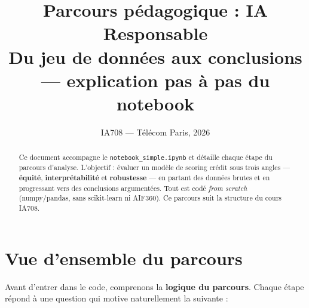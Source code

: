 \documentclass[11pt, a4paper]{article}
\title{\textbf{Parcours p\'{e}dagogique : IA Responsable\\[0.2em]
\large Du jeu de donn\'{e}es aux conclusions ---
explication pas \`{a} pas du notebook}}
\author{IA708 --- T\'{e}l\'{e}com Paris, 2026}
\date{}
\begin{document}
\maketitle
\vspace{-1em}

\begin{abstract}
\noindent Ce document accompagne le \texttt{notebook\_simple.ipynb} et d\'{e}taille chaque \'{e}tape du parcours d'analyse. L'objectif : \'{e}valuer un mod\`{e}le de scoring cr\'{e}dit sous trois angles --- \textbf{\'{e}quit\'{e}}, \textbf{interpr\'{e}tabilit\'{e}} et \textbf{robustesse} --- en partant des donn\'{e}es brutes et en progressant vers des conclusions argument\'{e}es. Tout est cod\'{e} \emph{from scratch} (numpy/pandas, sans scikit-learn ni AIF360). Ce parcours suit la structure du cours IA708.
\end{abstract}

\tableofcontents
\vspace{1em}

\section{Vue d'ensemble du parcours}
\label{sec:overview}

Avant d'entrer dans le code, comprenons la \textbf{logique du parcours}. Chaque \'{e}tape r\'{e}pond \`{a} une question qui motive naturellement la suivante :
\end{document}
